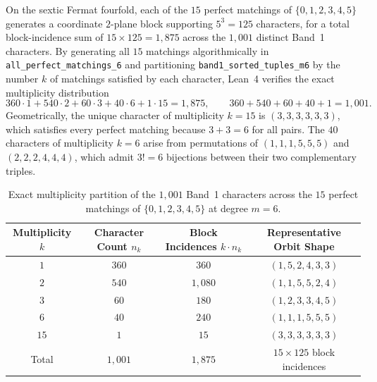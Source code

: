 \documentclass[11pt,a4paper]{article}
\begin{document}
On the sextic Fermat fourfold, each of the $15$ perfect matchings of $\{0, 1, 2, 3, 4, 5\}$ generates a coordinate $2$-plane block supporting $5^3 = 125$ characters, for a total block-incidence sum of $15 \times 125 = 1{,}875$ across the $1{,}001$ distinct Band~1 characters. By generating all $15$ matchings algorithmically in \texttt{all\_perfect\_matchings\_6} and partitioning \texttt{band1\_sorted\_tuples\_m6} by the number $k$ of matchings satisfied by each character, Lean~4 verifies the exact multiplicity distribution
\begin{equation}
  360 \cdot 1 + 540 \cdot 2 + 60 \cdot 3 + 40 \cdot 6 + 1 \cdot 15 = 1{,}875, \qquad 360 + 540 + 60 + 40 + 1 = 1{,}001.
\end{equation}
Geometrically, the unique character of multiplicity $k = 15$ is $(3, 3, 3, 3, 3, 3)$, which satisfies every perfect matching because $3 + 3 = 6$ for all pairs. The $40$ characters of multiplicity $k = 6$ arise from permutations of $(1, 1, 1, 5, 5, 5)$ and $(2, 2, 2, 4, 4, 4)$, which admit $3! = 6$ bijections between their two complementary triples.

\begin{table}[htbp]
  \centering
  \caption{Exact multiplicity partition of the $1{,}001$ Band~1 characters across the $15$ perfect matchings of $\{0,1,2,3,4,5\}$ at degree $m = 6$.}
  \label{tab:band1_mult}
  \begin{tabular}{cccc}
    \toprule
    Multiplicity $k$ & Character Count $n_k$ & Block Incidences $k \cdot n_k$ & Representative Orbit Shape \\
    \midrule
    $1$ & $360$ & $360$ & $(1, 5, 2, 4, 3, 3)$ \\
    $2$ & $540$ & $1{,}080$ & $(1, 1, 5, 5, 2, 4)$ \\
    $3$ & $60$ & $180$ & $(1, 2, 3, 3, 4, 5)$ \\
    $6$ & $40$ & $240$ & $(1, 1, 1, 5, 5, 5)$ \\
    $15$ & $1$ & $15$ & $(3, 3, 3, 3, 3, 3)$ \\
    \midrule
    Total & $1{,}001$ & $1{,}875$ & $15 \times 125$ block incidences \\
    \bottomrule
  \end{tabular}
\end{table}
\end{document}
